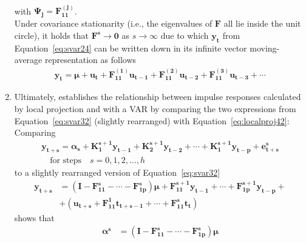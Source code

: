\documentclass[a4paper,11pt,listof=nochaptergap,oneside,pointednumbers,bibtotoc,bigheadings,liststotoc]{scrbook}
\newcommand{\vect}[1]{\boldsymbol{\mathbf{#1}}}
\begin{document}
\begin{enumerate}
\begin{equation}
\begin{split}
	\end{split}								
	\end{equation}		
	with $\vect{\Psi_j} = \vect{F_{11}^{(j)}}$. \\
	Under covariance stationarity (i.e., the eigenvalues of $\vect{F}$ all lie inside the unit circle), it holds that $\vect{F^s} \to \vect{0}$ as $s \to \infty$ due to which $\vect{y_t}$ from Equation~\ref{eq:svar24} can be written down in its infinite vector moving-average representation as follows
	\begin{equation} \label{eq:svar33}
	\begin{split}
		\vect{y_t} = \vect{\mu} + \vect{u_t} + \vect{F_{11}^{(1)}}\vect{u_{t-1}} + \vect{F_{11}^{(2)}}\vect{u_{t-2}} + \vect{F_{11}^{(3)}}\vect{u_{t-3}} + \cdots
	\end{split}								
	\end{equation}	
	\item Ultimately, \citet{jorda:05} establishes the relationship between impulse responses calculated by local projection and with a VAR by comparing the two expressions from Equation~\ref{eq:svar32} (slightly rearranged) with Equation~\ref{eq:localproj42}: \\Comparing
		\begin{equation} \label{eq:svar34}
	\begin{split}
		\vect{y_{t+s}} = \vect{\alpha_s} + \vect{K_1^{s+1}}\vect{y_{t-1}} + \vect{K_2^{s+1}}\vect{y_{t-2}} + \cdots + \vect{K_1^{s+1}}\vect{y_{t-p}} + \vect{e_{t+s}^s}\\
	\quad \text{for steps} \quad s=0, 1, 2, \dots, h 
	\end{split}								
	\end{equation}	
	to a slightly rearranged version of Equation~\ref{eq:svar32}
	\begin{equation} \label{eq:svar35}
	\begin{split}
		\vect{y_{t+s}} & = (\vect{I} - \vect{F_{11}^s} - \cdots - \vect{F_{1p}^s})\vect{\mu} + \vect{F_{11}^{s+1}}\vect{y_{t-1}} + \cdots + \vect{F_{1p}^{s+1}}\vect{y_{t-p}} + \\
		& + (\vect{u_{t+s}} + \vect{F_{11}^1}\vect{t_{t+s-1}} + \cdots + \vect{F_{11}^s}\vect{t_{t}})
	\end{split}								
	\end{equation}	
	shows that 
		\begin{equation} \label{eq:svar36}
	\begin{split}
		\vect{\alpha^s} & = (\vect{I} - \vect{F_{11}^s} - \cdots - \vect{F_{1p}^s})\vect{\mu} \\

\end{split}
\end{equation}
\end{enumerate}
\end{document}
